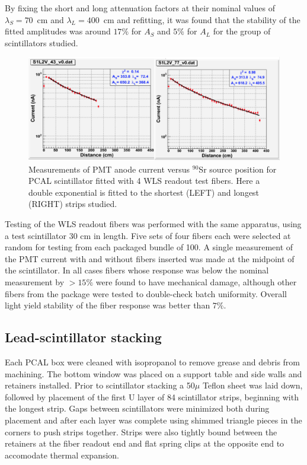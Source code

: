 By fixing the short and long attenuation factors at their nominal values of $\lambda_S=70$~cm and $\lambda_L=400$~cm and refitting, it was found that the stability of the fitted amplitudes was around $17\%$ for $A_S$ and $5\%$ for $A_L$ for the group of scintillators studied. 

\begin{figure}[hbt]
\centering
\includegraphics[width=0.95\columnwidth,keepaspectratio]{img/S5_0.png}
\caption{Measurements of PMT anode current versus $^{90}$Sr source position for PCAL scintillator fitted with 4 WLS readout test fibers. Here a double exponential is fitted to the shortest (LEFT) and longest (RIGHT) strips studied. }
\label{fig:S5_0}
\end{figure}

Testing of the WLS readout fibers was performed with the same apparatus, using a test scintillator 30 cm in length.  Five sets of four fibers each were selected at random for testing from each packaged bundle of 100.  A single measurement of the PMT current with and without fibers inserted was made at the midpoint of the scintillator.  In all cases fibers whose response was below the nominal measurement by $>15\%$ were found to have mechanical damage, although other fibers from the package were tested to double-check batch uniformity. Overall light yield stability of the fiber response was better than $7\%$.
 
\subsection{Lead-scintillator stacking}
Each PCAL box were cleaned with isopropanol to remove grease and debris from machining.  The bottom window was placed on a support table and side walls and retainers installed. Prior to scintillator stacking a 50$\mu$ Teflon sheet was laid down, followed by placement of the first U layer of 84 scintillator strips, beginning with the longest strip.  Gaps between scintillators were minimized both during placement and after each layer was complete using shimmed triangle pieces in the corners to push strips together.  Strips were also tightly bound between the retainers at the fiber readout end and flat spring clips at the opposite end to accomodate thermal expansion.

